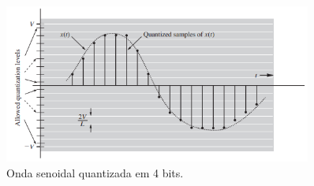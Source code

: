 



\begin{figure}[ht]
    \centering
    \caption{Onda senoidal quantizada em 4 bits.}
    \begin{center}
        \includegraphics[width=0.9\textwidth]{img/print_Conversao_AD1.png}
    \end{center}
    \vspace{-0.5cm}
    

    
    \label{fig:AD1}
\end{figure}








